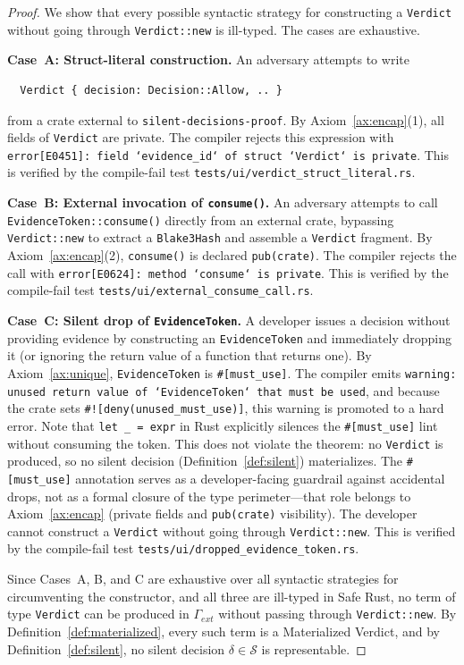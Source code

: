 \begin{proof}
We show that every possible syntactic strategy for constructing a
\texttt{Verdict} without going through \texttt{Verdict::new} is
ill-typed.  The cases are exhaustive.

\medskip
\noindent\textbf{Case~A: Struct-literal construction.}
An adversary attempts to write
\begin{verbatim}
  Verdict { decision: Decision::Allow, .. }
\end{verbatim}
from a crate external to \texttt{silent-decisions-proof}.
By Axiom~\ref{ax:encap}(1), all fields of \texttt{Verdict} are
private.  The compiler rejects this expression with
\texttt{error[E0451]: field `evidence\_id` of struct `Verdict` is
private}.  This is verified by the compile-fail test
\texttt{tests/ui/verdict\_struct\_literal.rs}.

\medskip
\noindent\textbf{Case~B: External invocation of \texttt{consume()}.}
An adversary attempts to call
\texttt{EvidenceToken::consume()} directly from an external crate,
bypassing \texttt{Verdict::new} to extract a \texttt{Blake3Hash} and
assemble a \texttt{Verdict} fragment.
By Axiom~\ref{ax:encap}(2), \texttt{consume()} is declared
\texttt{pub(crate)}.  The compiler rejects the call with
\texttt{error[E0624]: method `consume` is private}.
This is verified by the compile-fail test
\texttt{tests/ui/external\_consume\_call.rs}.

\medskip
\noindent\textbf{Case~C: Silent drop of \texttt{EvidenceToken}.}
A developer issues a decision without providing evidence by
constructing an \texttt{EvidenceToken} and immediately dropping it
(or ignoring the return value of a function that returns one).
By Axiom~\ref{ax:unique}, \texttt{EvidenceToken} is \texttt{\#[must\_use]}.
The compiler emits \texttt{warning: unused return value of
`EvidenceToken` that must be used}, and because the crate sets
\texttt{\#![deny(unused\_must\_use)]}, this warning is promoted to a
hard error.  Note that \texttt{let \_ = expr} in Rust explicitly silences the
\texttt{\#[must\_use]} lint without consuming the token.  This does
not violate the theorem: no \texttt{Verdict} is produced, so no
silent decision (Definition~\ref{def:silent}) materializes.  The
\texttt{\#[must\_use]} annotation serves as a developer-facing
guardrail against accidental drops, not as a formal closure of the
type perimeter---that role belongs to Axiom~\ref{ax:encap} (private
fields and \texttt{pub(crate)} visibility).  The developer cannot
construct a \texttt{Verdict} without going through
\texttt{Verdict::new}.
This is verified by the compile-fail test
\texttt{tests/ui/dropped\_evidence\_token.rs}.

\medskip
Since Cases~A, B, and C are exhaustive over all syntactic strategies
for circumventing the constructor, and all three are ill-typed in
Safe Rust, no term of type \texttt{Verdict} can be produced in
$\Gamma_{\mathit{ext}}$ without passing through
\texttt{Verdict::new}.  By Definition~\ref{def:materialized}, every
such term is a Materialized Verdict, and by
Definition~\ref{def:silent}, no silent decision $\delta \in
\mathcal{S}$ is representable.
\end{proof}

